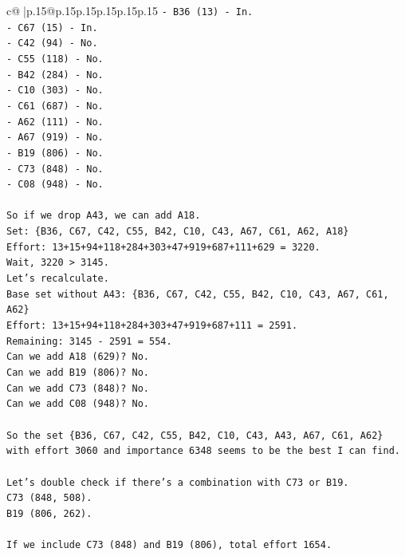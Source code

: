 \documentclass{article}
\begin{document}
{\begin{supertabular}{c@{$\;$}|p{.15\linewidth}@{}p{.15\linewidth}p{.15\linewidth}p{.15\linewidth}p{.15\linewidth}p{.15\linewidth}}
{{{\texttt{{-} B36 (13) {-} In.} \\
\texttt{{-} C67 (15) {-} In.} \\
\texttt{{-} C42 (94) {-} No.} \\
\texttt{{-} C55 (118) {-} No.} \\
\texttt{{-} B42 (284) {-} No.} \\
\texttt{{-} C10 (303) {-} No.} \\
\texttt{{-} C61 (687) {-} No.} \\
\texttt{{-} A62 (111) {-} No.} \\
\texttt{{-} A67 (919) {-} No.} \\
\texttt{{-} B19 (806) {-} No.} \\
\texttt{{-} C73 (848) {-} No.} \\
\texttt{{-} C08 (948) {-} No.} \\
\\ 
\texttt{So if we drop A43, we can add A18.} \\
\texttt{Set: \{B36, C67, C42, C55, B42, C10, C43, A67, C61, A62, A18\}} \\
\texttt{Effort: 13+15+94+118+284+303+47+919+687+111+629 = 3220.} \\
\texttt{Wait, 3220 > 3145.} \\
\texttt{Let's recalculate.} \\
\texttt{Base set without A43: \{B36, C67, C42, C55, B42, C10, C43, A67, C61, A62\}} \\
\texttt{Effort: 13+15+94+118+284+303+47+919+687+111 = 2591.} \\
\texttt{Remaining: 3145 {-} 2591 = 554.} \\
\texttt{Can we add A18 (629)? No.} \\
\texttt{Can we add B19 (806)? No.} \\
\texttt{Can we add C73 (848)? No.} \\
\texttt{Can we add C08 (948)? No.} \\
\\ 
\texttt{So the set \{B36, C67, C42, C55, B42, C10, C43, A43, A67, C61, A62\} with effort 3060 and importance 6348 seems to be the best I can find.} \\
\\ 
\texttt{Let's double check if there's a combination with C73 or B19.} \\
\texttt{C73 (848, 508).} \\
\texttt{B19 (806, 262).} \\
\\ 
\texttt{If we include C73 (848) and B19 (806), total effort 1654.} \\
}}}
\end{supertabular}}
\end{document}

